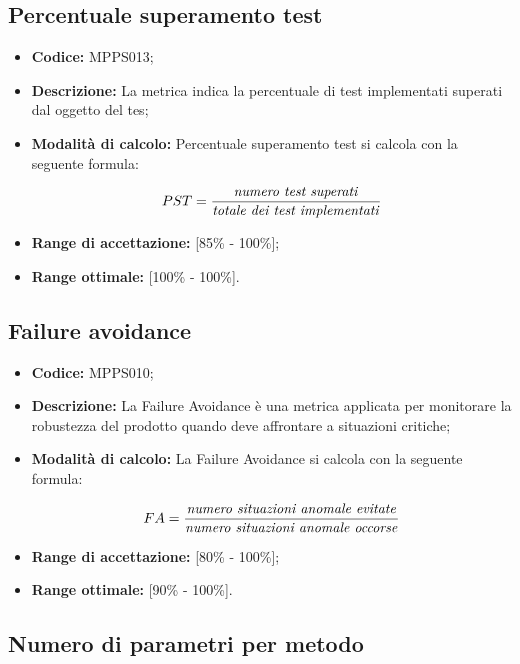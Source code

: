 \documentclass[openany,12pt,a4paper]{report}
\begin{document}
\subsection{Percentuale superamento test}

\begin{itemize}
    \item \textbf{Codice:} MPPS013;
    \item \textbf{Descrizione:} La metrica indica la percentuale di test implementati superati dal oggetto del tes;
    \item \textbf{Modalità di calcolo:} Percentuale superamento test si calcola con la seguente formula:
    
    \[ PST = \frac{\textrm{\textit{numero test superati}}}{\textrm{\textit{totale dei test implementati}}} \]
    
    \item \textbf{Range di accettazione:} [85\% - 100\%];
    \item \textbf{Range ottimale:} [100\% - 100\%].
\end{itemize}

\subsection{Failure avoidance}

\begin{itemize}
    \item \textbf{Codice:} MPPS010;
    \item \textbf{Descrizione:} La Failure Avoidance è una metrica applicata per monitorare la robustezza del prodotto quando deve affrontare a situazioni critiche;
    \item \textbf{Modalità di calcolo:} La Failure Avoidance si calcola con la seguente formula:
    
    \[ FA = \frac{\textrm{\textit{numero situazioni anomale evitate}}}{\textrm{\textit{numero situazioni anomale occorse}}} \]
    
    \item \textbf{Range di accettazione:} [80\% - 100\%];
    \item \textbf{Range ottimale:} [90\% - 100\%].
\end{itemize}

\subsection{Numero di parametri per metodo}
\end{document}
